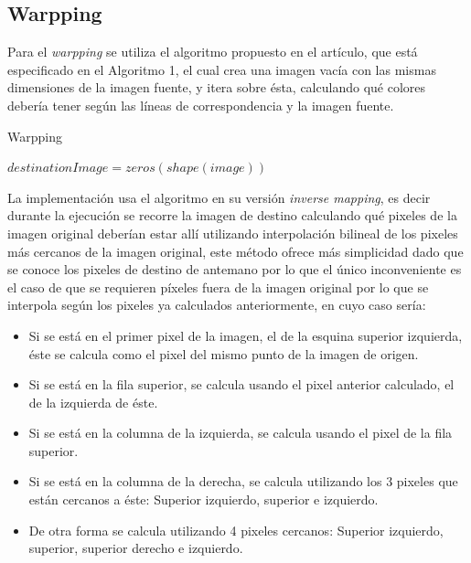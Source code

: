 \documentclass[conference]{IEEEtran}
\begin{document}
	\subsection*{Warpping}
		Para el \textit{warpping} se utiliza el algoritmo propuesto en el artículo\cite{Paper}, que está especificado en el Algoritmo 1, el cual crea una imagen vacía con las mismas dimensiones de la imagen fuente, y itera sobre ésta, calculando qué colores debería tener según las líneas de correspondencia y la imagen fuente.

	\begin{algorithm}[ht]
		\caption{Warpping}	
		\DontPrintSemicolon
	$destinationImage = zeros(shape(image)) $ \;
		\label{asdf}
		\end{algorithm} 

	La implementación usa el algoritmo en su versión \textit{inverse mapping}, es decir durante la ejecución se recorre la imagen de destino calculando qué pixeles de la imagen original deberían estar allí utilizando interpolación bilineal de los pixeles más cercanos de la imagen original, este método ofrece más simplicidad dado que se conoce los pixeles de destino de antemano por lo que el único inconveniente es el caso de que se requieren píxeles fuera de la imagen original por lo que se interpola según los pixeles ya calculados anteriormente, en cuyo caso sería:
		\begin{itemize}
               	\item Si se está en el primer pixel de la imagen, el de la esquina superior izquierda, éste se calcula como el pixel del mismo punto de la imagen de origen.
               	\item Si se está en la fila superior, se calcula usando el pixel anterior calculado, el de la izquierda de éste.
               	\item Si se está en la columna de la izquierda, se calcula usando el pixel de la fila superior.
               	\item Si se está en la columna de la derecha, se calcula utilizando los 3 pixeles que están cercanos a éste: Superior izquierdo, superior e izquierdo.
               	\item De otra forma se calcula utilizando 4 pixeles cercanos: Superior izquierdo, superior, superior derecho e izquierdo.
		\end{itemize}
	
\end{document}
